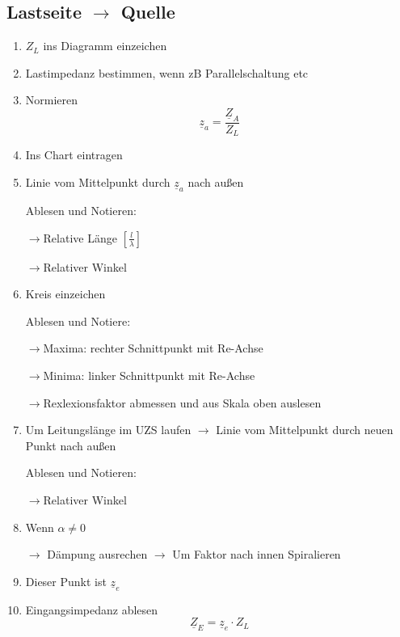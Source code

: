 \subsection[Von Last zu Quelle]{Lastseite $\rightarrow$ Quelle}
\begin{enumerate}
    \item $Z_L$ ins Diagramm einzeichen
    \item Lastimpedanz bestimmen,
          wenn zB Parallelschaltung etc
    \item Normieren
          \[\underline{z}_a = \frac{\underline{Z}_A}{Z_L} \]
    \item Ins Chart eintragen
    \item Linie vom Mittelpunkt durch $\underline{z}_a$ nach außen

          Ablesen und Notieren:

          $\rightarrow$Relative Länge $\left[\frac{l}{\lambda}\right]$

          $\rightarrow$Relativer Winkel
    \item Kreis einzeichen

          Ablesen und Notiere:

          $\rightarrow$Maxima: rechter Schnittpunkt mit Re-Achse

          $\rightarrow$Minima: linker  Schnittpunkt mit Re-Achse

          $\rightarrow$Rexlexionsfaktor abmessen und aus Skala oben auslesen
    \item Um Leitungslänge im UZS laufen
          $\rightarrow$ Linie vom Mittelpunkt durch neuen Punkt nach außen

          Ablesen und Notieren:

          $\rightarrow$Relativer Winkel
    \item Wenn $\alpha\neq 0$

          $\rightarrow$ Dämpung ausrechen
          $\rightarrow$ Um Faktor nach innen Spiralieren

    \item Dieser Punkt ist $\underline{z}_e$
    \item Eingangsimpedanz ablesen
          \[\underline{Z}_E = \underline{z}_e \cdot Z_L\]
\end{enumerate}